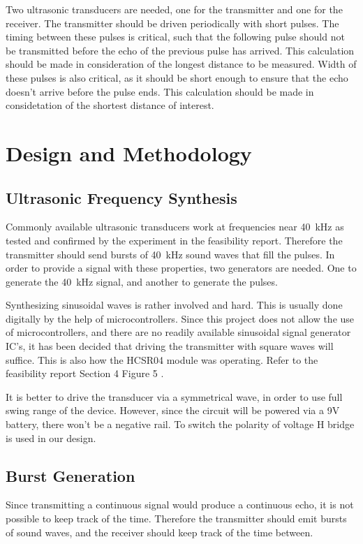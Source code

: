 \documentclass[12pt, a4paper]{article}
\begin{document}
        \bigskip 
        Two ultrasonic transducers are needed, one for the transmitter and one for the receiver. The transmitter should be driven periodically with short pulses. The timing between these pulses is critical, such that the following pulse should not be transmitted before the echo of the previous pulse has arrived. This calculation should be made in consideration of the longest distance to be measured. Width of these pulses is also critical, as it should be short enough to ensure that the echo doesn't arrive before the pulse ends. This calculation should be made in considetation of the shortest distance of interest. 
    

    \pagebreak    
    \section{Design and Methodology}
    	\subsection{Ultrasonic Frequency Synthesis}
	
	    Commonly available ultrasonic transducers work at frequencies near \SI{40}{\kilo\hertz} as tested and confirmed by the experiment in the feasibility report. Therefore the transmitter should send bursts of \SI{40}{\kilo\hertz} sound waves that fill the pulses. In order to provide a signal with these properties, two generators are needed. One to generate the \SI{40}{\kilo\hertz} signal, and another to generate the pulses.
	    
	  \bigskip 
	Synthesizing sinusoidal waves is rather involved and hard. This is usually done digitally by the help of microcontrollers. Since this project does not allow the use of microcontrollers, and there are no readily available sinusoidal signal generator IC’s, it has been decided that driving the transmitter with square waves will suffice. This is also how the HCSR04 module was operating. Refer to the feasibility report Section 4 Figure 5 .
	
	\bigskip
	It is better to drive the transducer via a symmetrical wave, in order to use full swing range of the device. However, since the circuit will be powered via a 9V battery, there won’t be a negative rail. To switch the polarity of voltage H bridge is used in our design.


	\subsection{Burst Generation}
	Since transmitting a continuous signal would produce a continuous echo, it is not possible to keep track of the time. Therefore the transmitter should emit bursts of sound waves, and the receiver should keep track of the time between.
 	
\end{document}
